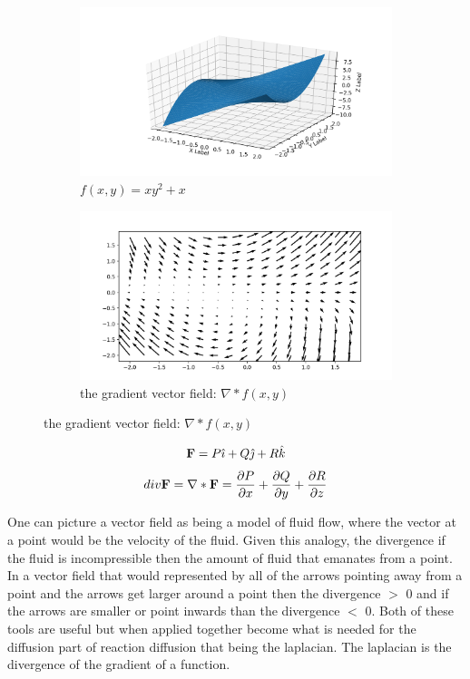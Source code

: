 \documentclass[12pt, letterpaper]{article}
\begin{document}
\begin{figure}[!b]
  \centering
  \begin{subfigure}[b]{.45\linewidth}
    \includegraphics[width=\linewidth]{multifn}
    \caption{$f(x,y) = xy^2 + x$}
  \end{subfigure}
  \begin{subfigure}[b]{.5\linewidth}
    \includegraphics[width=\linewidth]{gradient}
    \caption{the gradient vector field: $\nabla * f(x,y)$}
  \end{subfigure}
\end{figure}

\begin{equation}
  \bold{F} = P\hat{\imath} + Q\hat{\jmath} + R\hat{k} \\
  \label{eq:vectorFn}
\end{equation}
\begin{equation}
  div \bold{F} = \nabla * \bold{F} = \frac{\partial P}{\partial x} + \frac{\partial Q}{\partial y} +
 \frac{\partial R}{\partial z}
  \label{eq:div}
\end{equation}

\newpage
One can picture a vector field as being a model of fluid flow, where the vector at a point would be the
velocity of the fluid. Given this analogy, the divergence if the fluid is incompressible then the amount of
fluid that emanates from a point. In a vector field that would represented by all of the arrows pointing away
from a point and the arrows get larger around a point then the divergence $>$ 0 and if the arrows are smaller
or point inwards than the divergence $<$ 0. Both of these tools are useful but when applied together become
what is needed for the diffusion part of reaction diffusion that being the laplacian. The laplacian is the
divergence of the gradient of a function.
\end{document}
